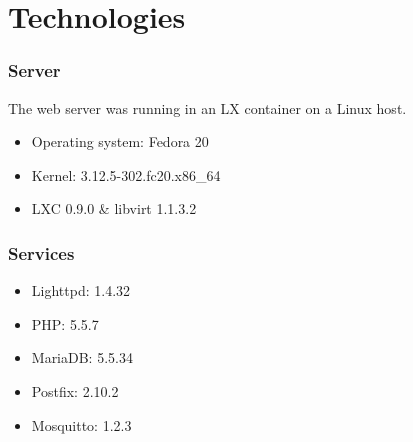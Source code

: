 \section{Technologies}
%
\begin{frame}
\frametitle{Server}
%
The web server was running in an LX container on a Linux host.
%
\begin{itemize}
  \item Operating system: Fedora 20
  \item Kernel: 3.12.5-302.fc20.x86\_64
  \item LXC 0.9.0 \& libvirt 1.1.3.2
\end{itemize}
\end{frame}
%
\begin{frame}
\frametitle{Services}
%
\begin{itemize}
  \item Lighttpd: 1.4.32
  \item PHP: 5.5.7
  \item MariaDB: 5.5.34
  \item Postfix: 2.10.2
  \item Mosquitto: 1.2.3
\end{itemize}
\end{frame}
